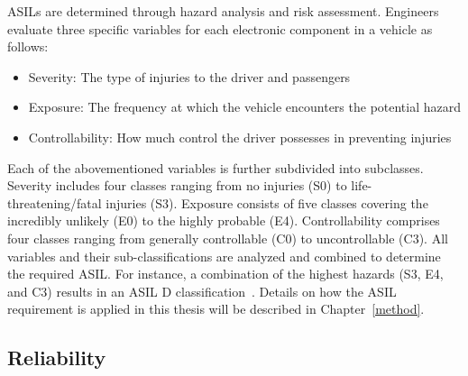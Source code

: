     ASILs are determined through hazard analysis and risk assessment. Engineers evaluate three specific variables for each electronic component in a vehicle as follows:
    
    \begin{itemize}
        \item Severity: The type of injuries to the driver and passengers
        \item Exposure: The frequency at which the vehicle encounters the potential hazard
        \item Controllability: How much control the driver possesses in preventing injuries
    \end{itemize}


    Each of the abovementioned variables is further subdivided into subclasses. Severity includes four classes ranging from no injuries (S0) to life-threatening/fatal injuries (S3). Exposure consists of five classes covering the incredibly unlikely (E0) to the highly probable (E4). Controllability comprises four classes ranging from generally controllable (C0) to uncontrollable (C3). All variables and their sub-classifications are analyzed and combined to determine the required ASIL. For instance, a combination of the highest hazards (S3, E4, and C3) results in an ASIL D classification~\cite{iso26262}.
    Details on how the ASIL requirement is applied in this thesis will be described in Chapter~\ref{method}.

    
    
    
    \subsection{Reliability}
  
